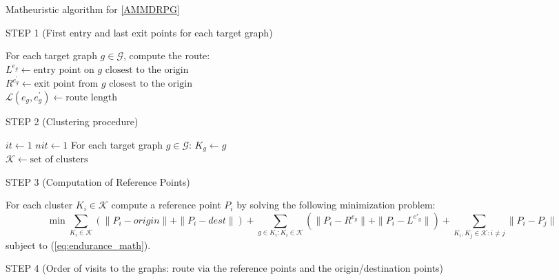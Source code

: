 \begin{algorithm}
\caption{Matheuristic algorithm for \ref{AMMDRPG}}\label{alg:math}

STEP 1 (First entry and last exit points for each target graph)\\
\begin{algorithmic}
\State For each target graph $g \in \mathcal{G}$, compute the route:\\
 $ L^{e_{g}} \gets \mbox{entry point on $g$ closest to the origin}$\\
 $R^{e^{'}_{g}} \gets \mbox{exit point from $g$ closest to the origin}$\\
 $\mathcal L(e_{g}, e^{'}_{g}) \gets \mbox{route length}$
\end{algorithmic}
STEP 2 (Clustering procedure)
\begin{algorithmic}
\State $it \gets 1$
\State $nit \gets 1$
\State For each target graph $g \in \mathcal{G}$:\;
$K_g \gets g$ \\
$\mathcal K \gets \mbox{set of clusters}$
\end{algorithmic}
STEP 3 (Computation of Reference Points) 
\begin{algorithmic}
\State For each cluster $K_i \in \mathcal K$\;
compute a reference point $P_i$ by solving the following minimization problem:
$$
\min \sum_{K_i \in \mathcal K}( \|P_i - origin\| + \|P_i - dest \|) + \sum_{g \in K_i: K_i \in \mathcal K} (\|P_i - R^{e_g} \| + \| P_i - L^{e'_g}\|) + \sum_{K_i, K_j \in \mathcal K: i \neq j} \|P_i - P_j\|
$$
subject to (\ref{eq:endurance_math}).
\end{algorithmic}
STEP 4 (Order of visits to the graphs: route via the reference points and the origin/destination points)

\end{algorithm}
